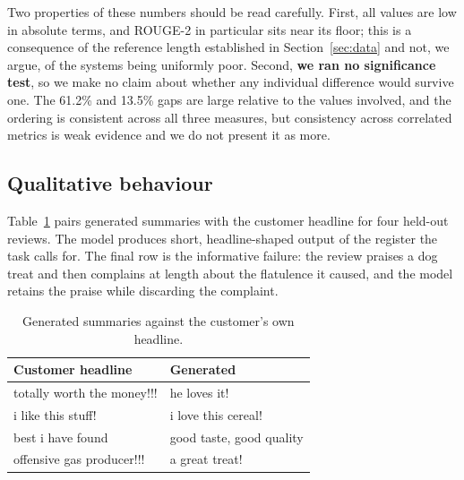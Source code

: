 Two properties of these numbers should be read carefully. First, all values are
low in absolute terms, and ROUGE-2 in particular sits near its floor; this is a
consequence of the reference length established in Section~\ref{sec:data} and
not, we argue, of the systems being uniformly poor. Second, \textbf{we ran no
significance test}, so we make no claim about whether any individual difference
would survive one. The 61.2\% and 13.5\% gaps are large relative to the values
involved, and the ordering is consistent across all three measures, but
consistency across correlated metrics is weak evidence and we do not present it
as more.

\subsection{Qualitative behaviour}

Table~\ref{tab:examples} pairs generated summaries with the customer headline
for four held-out reviews. The model produces short, headline-shaped output of
the register the task calls for. The final row is the informative failure: the
review praises a dog treat and then complains at length about the flatulence it
caused, and the model retains the praise while discarding the complaint.

\begin{table}[t]
\caption{Generated summaries against the customer's own headline.}
\label{tab:examples}
\centering
\begin{tabular}{p{}p{}}
\toprule
\textbf{Customer headline} & \textbf{Generated} \\
\midrule
totally worth the money!!! & he loves it! \\
i like this stuff!         & i love this cereal! \\
best i have found          & good taste, good quality \\
offensive gas producer!!!  & a great treat! \\
\bottomrule
\end{tabular}
\end{table}
